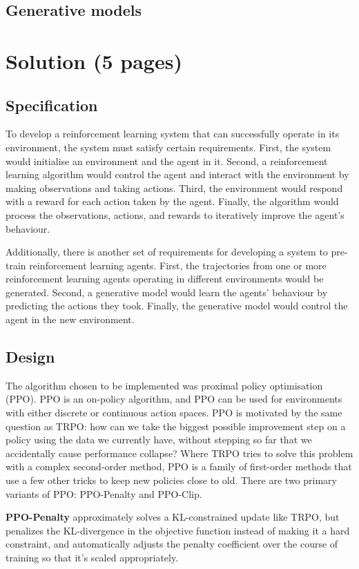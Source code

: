 \documentclass[12pt,a4paper]{article}
\begin{document}
\subsection{Generative models}

\newpage
\section{Solution (5 pages)}
\subsection{Specification}
To develop a reinforcement learning system that can successfully operate in its environment, the system must satisfy certain requirements. First, the system would initialise an environment and the agent in it. Second, a reinforcement learning algorithm would control the agent and interact with the environment by making observations and taking actions. Third, the environment would respond with a reward for each action taken by the agent. Finally, the algorithm would process the observations, actions, and rewards to iteratively improve the agent's behaviour.  

Additionally, there is another set of requirements for developing a system to pre-train reinforcement learning agents. First, the trajectories from one or more reinforcement learning agents operating in different environments would be generated. Second, a generative model would learn the agents' behaviour by predicting the actions they took. Finally, the generative model would control the agent in the new environment.  

\subsection{Design}
The algorithm chosen to be implemented was proximal policy optimisation (PPO). PPO is an on-policy algorithm, and PPO can be used for environments with either discrete or continuous action spaces. PPO is motivated by the same question as TRPO: how can we take the biggest possible improvement step on a policy using the data we currently have, without stepping so far that we accidentally cause performance collapse? Where TRPO tries to solve this problem with a complex second-order method, PPO is a family of first-order methods that use a few other tricks to keep new policies close to old. There are two primary variants of PPO: PPO-Penalty and PPO-Clip.

\textbf{PPO-Penalty} approximately solves a KL-constrained update like TRPO, but penalizes the KL-divergence in the objective function instead of making it a hard constraint, and automatically adjusts the penalty coefficient over the course of training so that it’s scaled appropriately.
\end{document}
